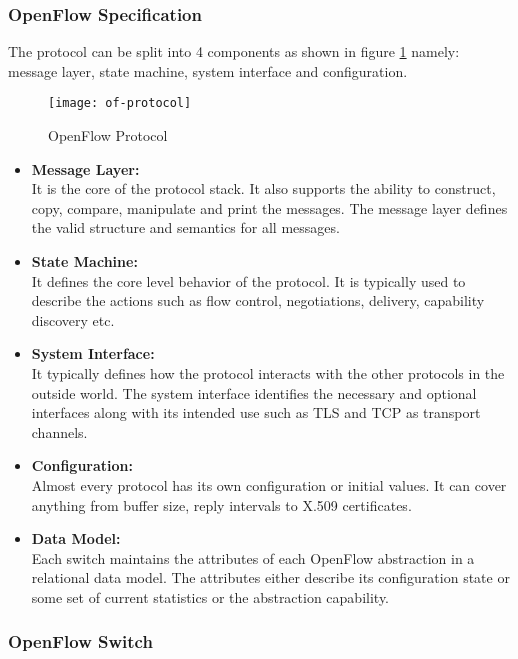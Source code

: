 \subsubsection{OpenFlow Specification \cite{Openflow_protocol_spec}} \label{OpenFlow_Protocol_spec}
The protocol can be split into 4 components as shown in figure \ref{fig:Of_proto} namely: message layer, state machine, system interface and configuration. 
\begin{figure}
	\centering
	\texttt{[image: of-protocol]}
	\caption{OpenFlow Protocol \cite{of_protocol_spec_img}} \label{fig:Of_proto}
	\vspace{-10pt}
\end{figure}

\begin{itemize}
	\item \textbf{Message Layer:} 
	\\ It is the core of the protocol stack. It also supports the ability to construct, copy, compare, manipulate and print the messages. The message layer defines the valid structure and semantics for all messages.   
	\item \textbf{State Machine:}
	\\ It defines the core level behavior of the protocol. It is typically used to describe the actions such as flow control, negotiations, delivery, capability discovery etc.
	\item \textbf{System Interface:}
	\\ It typically defines how the protocol interacts with the other protocols in the outside world. The system interface identifies the necessary and optional interfaces along with its intended use such as TLS and TCP as transport channels.
	\item \textbf{Configuration:}
	\\ Almost every protocol has its own configuration or initial values. It can cover anything from buffer size, reply intervals to X.509 certificates.
	\item \textbf{Data Model:}
	\\ Each switch maintains the attributes of each OpenFlow abstraction in a relational data model.  The attributes either describe its configuration state or some set of current statistics or the abstraction capability. 

\end{itemize}

\subsubsection{OpenFlow Switch \cite{Opnflow_switch}} \label{OpenFlow_Switch}

